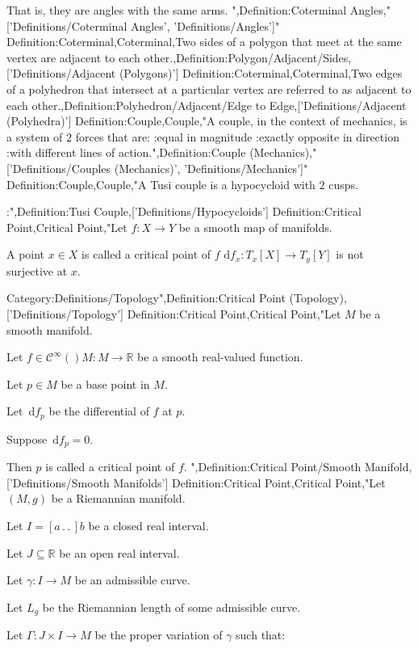 That is, they are angles with the same arms.
",Definition:Coterminal Angles,"['Definitions/Coterminal Angles', 'Definitions/Angles']"
Definition:Coterminal,Coterminal,Two sides of a polygon that meet at the same vertex are adjacent to each other.,Definition:Polygon/Adjacent/Sides,['Definitions/Adjacent (Polygons)']
Definition:Coterminal,Coterminal,Two edges of a polyhedron that intersect at a particular vertex are referred to as adjacent to each other.,Definition:Polyhedron/Adjacent/Edge to Edge,['Definitions/Adjacent (Polyhedra)']
Definition:Couple,Couple,"A couple, in the context of mechanics, is a system of $2$ forces that are:
:equal in magnitude
:exactly opposite in direction
:with different lines of action.",Definition:Couple (Mechanics),"['Definitions/Couples (Mechanics)', 'Definitions/Mechanics']"
Definition:Couple,Couple,"A Tusi couple is a hypocycloid with $2$ cusps.


:",Definition:Tusi Couple,['Definitions/Hypocycloids']
Definition:Critical Point,Critical Point,"Let $f: X \to Y$ be a smooth map of manifolds.


A point $x \in X$ is called a critical point of $f$  $\mathrm d f_x: T_x \left[ X \right] \to T_y \left[ Y \right]$ is not surjective at $x$.



Category:Definitions/Topology",Definition:Critical Point (Topology),['Definitions/Topology']
Definition:Critical Point,Critical Point,"Let $M$ be a smooth manifold.

Let $f \in \mathcal C^\infty \left(   \right)M : M \to \mathbb R$ be a smooth real-valued function.

Let $p \in M$ be a base point in $M$.

Let $\,\mathrm d f_p$ be the differential of $f$ at $p$.

Suppose $\,\mathrm d f_p = 0$.


Then $p$ is called a critical point of $f$.
",Definition:Critical Point/Smooth Manifold,['Definitions/Smooth Manifolds']
Definition:Critical Point,Critical Point,"Let $\left( M, g \right)$ be a Riemannian manifold.

Let $I = \left[ a \,.\,.\,   \right]b$ be a closed real interval.

Let $J \subseteq \mathbb R$ be an open real interval.

Let $\gamma : I \to M$ be an admissible curve.

Let $L_g$ be the Riemannian length of some admissible curve.

Let $\Gamma : J \times I \to M$ be the proper variation of $\gamma$ such that:


